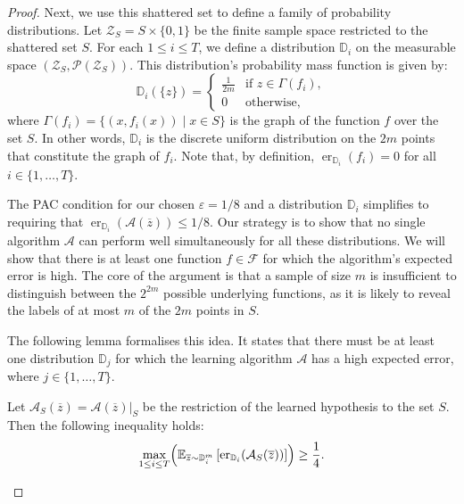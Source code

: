 \begin{proof}
    Next, we use this shattered set to define a family of probability distributions. Let $\mathcal{Z}_S = S \times \{0,1\}$ be the finite sample space restricted to the shattered set $S$. For each $1 \leq i \leq T$, we define a distribution $\mathbb{D}_i$ on the measurable space $(\mathcal{Z}_S, \mathcal{P}(\mathcal{Z}_S))$. This distribution's probability mass function is given by:
    \[
        \mathbb{D}_i(\{z\}) =
        \begin{cases}
            \frac{1}{2m} & \text{if } z \in \Gamma(f_i), \\
            0 & \text{otherwise},
        \end{cases}
    \]
    where $\Gamma(f_i) = \{(x, f_i(x)) \mid x \in S\}$ is the graph of the function $f$ over the set $S$. In other words, $\mathbb{D}_i$ is the discrete uniform distribution on the $2m$ points that constitute the graph of $f_i$. Note that, by definition, $\operatorname{er}_{\mathbb{D}_i}(f_i) = 0$ for all $i \in \{1, \dots, T\}$.

    The PAC condition for our chosen $\varepsilon=1/8$ and a distribution $\mathbb{D}_i$ simplifies to requiring that $\operatorname{er}_{\mathbb{D}_i}(\mathcal{A}(\overline{z})) \le 1/8$. Our strategy is to show that no single algorithm $\mathcal{A}$ can perform well simultaneously for all these distributions. We will show that there is at least one function $f \in \mathcal{F}$ for which the algorithm's expected error is high. The core of the argument is that a sample of size $m$ is insufficient to distinguish between the $2^{2m}$ possible underlying functions, as it is likely to reveal the labels of at most $m$ of the $2m$ points in $S$.

    The following lemma formalises this idea. It states that there must be at least one distribution $\mathbb{D}_j$ for which the learning algorithm $\mathcal{A}$ has a high expected error, where $j \in \{1, \dots, T\}$.

    \begin{lemma}
        \label{lem:no-free-lunch}
        Let $\mathcal{A}_S(\overline{z}) = \mathcal{A}(\overline{z})|_S$ be the restriction of the learned hypothesis to the set $S$. Then the following inequality holds:
        \[
            \max_{1 \leq i \leq T} \Bigl( \mathbb{E}_{\overline{z} \sim \mathbb{D}_i^m} \left[ \operatorname{er}_{\mathbb{D}_i}(\mathcal{A}_S(\overline{z})) \right]\Bigr) \ge \frac{1}{4}.
        \]
    \end{lemma}

    \begin{subproof}


\end{subproof}
\end{proof}
